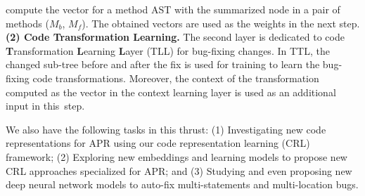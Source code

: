 compute the vector for a method AST with the summarized node in a pair
of methods ($M_b$, $M_f$). The obtained vectors are used as the weights
in the next step. {\bf (2) Code Transformation
	Learning.}  The second layer is dedicated to code
\textbf{T}ransformation \textbf{L}earning \textbf{L}ayer (TLL) for
bug-fixing changes. In TTL, the changed sub-tree before and after the
fix is used for training to learn the bug-fixing code
transformations. Moreover, the context of the transformation computed
as the vector in the context learning layer is used as an additional
input in this~step.

We also have the following tasks in this thrust: (1) Investigating new
code representations for APR using our code representation learning
(CRL) framework; (2) Exploring new embeddings and learning
models to propose new CRL approaches specialized for APR; and (3)
Studying and even proposing new deep neural network models to auto-fix
multi-statements and multi-location bugs.

